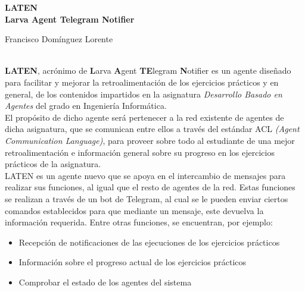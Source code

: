 \thispagestyle{empty}

\begin{center}
	{\large\bfseries LATEN \\ Larva Agent Telegram Notifier }\\
\end{center}
\begin{center}
	Francisco Domínguez Lorente\\
\end{center}


\vspace{0.5cm}
\vspace{0.7cm}

\\
	\textbf{LATEN}, acrónimo de \textbf{L}arva \textbf{A}gent \textbf{TE}legram \textbf{N}otifier es un agente diseñado para facilitar y mejorar la retroalimentación
	de los ejercicios prácticos y en general, de los contenidos impartidos en la asignatura \textit{Desarrollo Basado en Agentes} del grado en Ingeniería Informática.\\

	El propósito de dicho agente será pertenecer a la red existente de agentes de dicha asignatura, que se comunican entre ellos a través del estándar ACL \textit{(Agent Communication Language)},
	para proveer sobre todo al estudiante de una mejor retroalimentación e información general sobre su progreso en los ejercicios prácticos de la asignatura.\\

	LATEN es un agente nuevo que se apoya en el intercambio de mensajes para realizar sus funciones, al igual que el resto de agentes de la red. Estas funciones se realizan a través de un
	bot de Telegram, al cual se le pueden enviar ciertos comandos establecidos para que mediante un mensaje, este devuelva la información requerida. Entre otras funciones, se encuentran, por ejemplo:
    
	\begin{itemize}
		\item Recepción de notificaciones de las ejecuciones de los ejercicios prácticos
		\item Información sobre el progreso actual de los ejercicios prácticos
		\item Comprobar el estado de los agentes del sistema
	\end{itemize}
    
